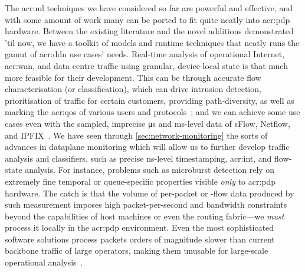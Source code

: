 %

The \gls{acr:ml} techniques we have considered so far are powerful and effective, and with some amount of work many can be ported to fit quite neatly into \gls{acr:pdp} hardware.
Between the existing literature and the novel additions demonstrated 'til now, we have a toolkit of models and runtime techniques that neatly runs the gamut of \gls{acr:ddn} use cases' needs.
Real-time analysis of operational Internet, \gls{acr:wan}, and data centre traffic using granular, device-local state is that much more feasible for their development.
This can be through accurate flow characterisation (or classification), which can drive intrusion detection, prioritisation of traffic for certain customers, providing path-diversity, as well as marking the \gls{acr:qos} of various users and protocols~\parencite{DBLP:journals/ccr/BernailleTASS06,DBLP:conf/lisa/Roesch99}; and we can achieve some use cases even with the sampled, imprecise \unit{\micro\second} and \unit{\milli\second}-level data of sFlow, Netflow, and IPFIX~\parencite{rfc7011,rfc3954}.
We have seen through \cref{sec:network-monitoring} the sorts of advances in dataplane monitoring which will allow us to further develop traffic analysis and classifiers, such as precise \unit{\nano\second}-level timestamping, \gls{acr:int}, and flow-state analysis.
For instance, problems such as microburst detection rely on extremely fine temporal or queue-specific properties visible \emph{only} to \gls{acr:pdp} hardware.
The catch is that the volume of per-packet or -flow data produced by such measurement imposes high packet-per-second and bandwidth constraints beyond the capabilities of host machines or even the routing fabric---we \emph{must} process it locally in the \gls{acr:pdp} environment.
Even the most sophisticated software solutions process packets orders of magnitude slower than current backbone traffic of large operators, making them unusable for large-scale operational analysis~\parencite{DBLP:journals/wpc/ParkA17}.

